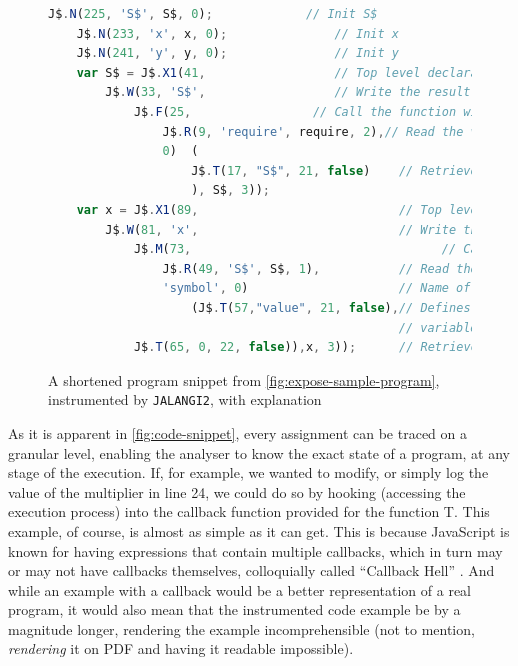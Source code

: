 \begin{figure}[ht]

 \lstset{basicstyle=\footnotesize}
    \begin{lstlisting}[language=JavaScript, gobble=4]
    J$.N(225, 'S$', S$, 0);             // Init S$
    J$.N(233, 'x', x, 0);               // Init x
    J$.N(241, 'y', y, 0);               // Init y
    var S$ = J$.X1(41,                  // Top level declaration
        J$.W(33, 'S$',                  // Write the result of the following:
            J$.F(25,                 // Call the function with the follwing parameter:
                J$.R(9, 'require', require, 2),// Read the value of "require"
                0)  (
                    J$.T(17, "S$", 21, false)    // Retrieve the value of the S$ object
                    ), S$, 3));
    var x = J$.X1(89,                            // Top level declaration
        J$.W(81, 'x',                            // Write the result of the following:
            J$.M(73,                                   // Call the function of:
                J$.R(49, 'S$', S$, 1),           // Read the value of the expression S$
                'symbol', 0)                     // Name of the called function
                    (J$.T(57,"value", 21, false),// Defines the value of the 
                                                 // variable as literal
            J$.T(65, 0, 22, false)),x, 3));      // Retrieve the value "0"


    \end{lstlisting}
    \caption{A shortened program snippet from \autoref{fig:expose-sample-program}, instrumented by \texttt{JALANGI2}, with explanation}
    \label{fig:code-snippet}
\end{figure}
\newpage
As it is apparent in \autoref{fig:code-snippet}, every assignment can be traced on a granular level, enabling the analyser to know the exact state of a program, at any stage of the execution. If, for example, we wanted to modify, or simply log the value of the multiplier in line 24, we could do so by hooking (accessing the execution process) into the callback function provided for the function T.
This example, of course, is almost as simple as it can get. This is because JavaScript is known for having expressions that contain multiple callbacks, which in turn may or may not have callbacks themselves, colloquially called “Callback Hell” \cite{max_ogden_callback_2019}. And while an example with a callback would be a better representation of a real program, it would also mean that the instrumented code example be by a magnitude longer, rendering the example incomprehensible (not to mention, \textit{rendering} it on PDF and having it readable impossible). \\


